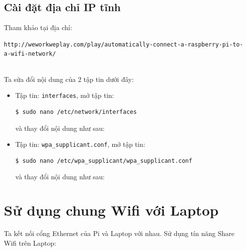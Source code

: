 \subsection{Cài đặt địa chỉ IP tĩnh}
Tham khảo tại địa chỉ: 

\begin{footnotesize}
\verb|http://weworkweplay.com/play/automatically-connect-a-raspberry-pi-to-a-wifi-network/|
\end{footnotesize}\\

Ta sửa đổi nội dung của 2 tập tin dưới đây:
\begin{itemize}
\item Tập tin: \verb|interfaces|, mở tập tin:
\begin{lstlisting}[language=bash]
$ sudo nano /etc/network/interfaces
\end{lstlisting}
và thay đổi nội dung như sau:

\item Tập tin: \verb|wpa_supplicant.conf|,  mở tập tin:
\begin{lstlisting}[language=bash]
$ sudo nano /etc/wpa_supplicant/wpa_supplicant.conf
\end{lstlisting}
và thay đổi nội dung như sau:

\end{itemize}
\section{Sử dụng chung Wifi với Laptop}
Ta kết nối cổng Ethernet của Pi và Laptop với nhau. Sử dụng tín năng Share Wifi trên Laptop:
